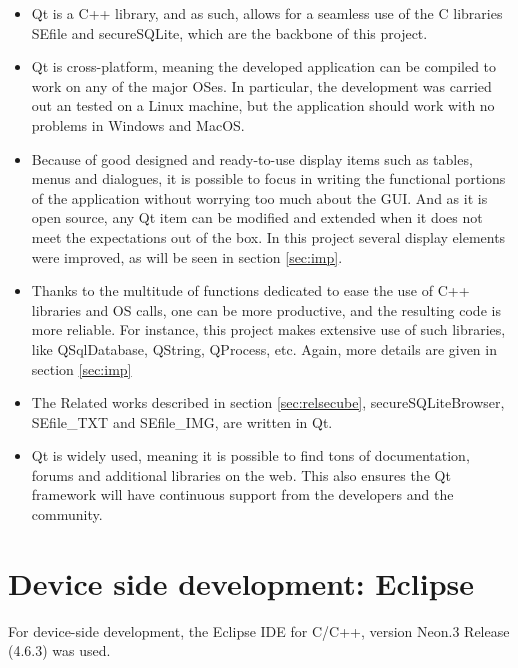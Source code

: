 \begin{itemize}
\setlength\itemsep{0pt}
\item Qt is a C++ library, and as such, allows for a seamless use of the C libraries SEfile and secureSQLite, which are the backbone of this project.

\item Qt is cross-platform, meaning the developed application can be compiled to work on any of the major OSes. In particular, the development was carried out an tested on a Linux machine, but the application should work with no problems in Windows and MacOS. 

\item Because of good designed and ready-to-use display items such as tables, menus and dialogues, it is possible to focus in writing the functional portions of the application without worrying too much about the GUI. And as it is open source, any Qt item can be modified and extended when it does not meet the expectations out of the box. In this project several display elements were improved, as will be seen in section \ref{sec:imp}.

\item Thanks to the multitude of functions dedicated to ease the use of C++ libraries and OS calls, one can be more productive, and the resulting code is more reliable. For instance, this project makes extensive use of such libraries, like QSqlDatabase, QString, QProcess, etc. Again, more details are given in section \ref{sec:imp}

\item The Related works described in section \ref{sec:relsecube}, secureSQLiteBrowser, SEfile\_TXT and SEfile\_IMG, are written in Qt.

\item Qt is widely used, meaning it is possible to find tons of documentation, forums and additional libraries on the web. This also ensures the Qt framework will have continuous support from the developers and the community.

\end{itemize}

\section{Device side development: Eclipse}

For device-side development, the Eclipse IDE for C/C++, version Neon.3 Release (4.6.3) \cite{eclipse} was used. 

